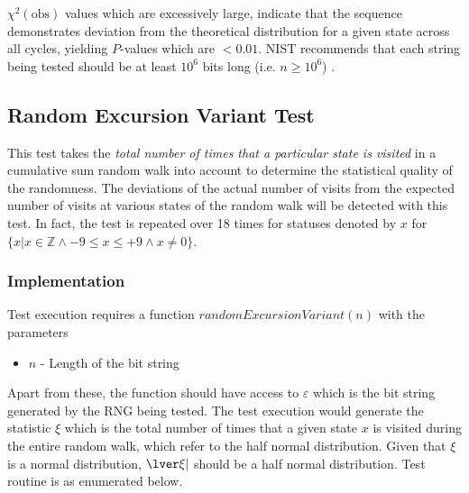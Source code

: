 $\chi^2(\text{obs})$ values which are excessively large, indicate that the sequence demonstrates deviation from the theoretical distribution for a given state across all cycles, yielding $P$-values which are $<0.01$. NIST recommends that each string being tested should be at least $10^6$ bits long (i.e. $n\geq10^6$) \cite{rep_nist_sp_80022}.

\subsection{Random Excursion Variant Test}

This test takes the \textit{total number of times that a particular state is visited} in a cumulative sum random walk into account to determine the statistical quality of the randomness. The deviations of the actual number of visits from the expected number of visits at various states of the random walk will be detected with this test. In fact, the test is repeated over 18 times for statuses denoted by $x$ for $\{x \lvert x \in \mathbb{Z} \land -9 \leq x \leq +9 \land x \neq 0\}$.

\subsubsection{Implementation}

Test execution requires a function $randomExcursionVariant(n)$ with the parameters

\begin{itemize}
    \item $n$ - Length of the bit string
\end{itemize}

Apart from these, the function should have access to $\varepsilon$ which is the bit string generated by the RNG being tested. The test execution would generate the statistic $\xi$ which is the total number of times that a given state $x$ is visited during the entire random walk, which refer to the half normal distribution. Given that $\xi$ is a normal distribution, $\lver\xi\rvert$ should be a half normal distribution. Test routine is as enumerated below.

